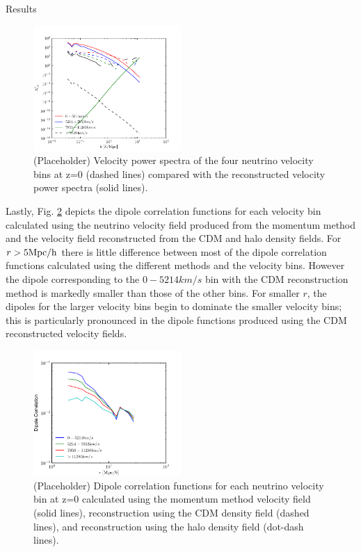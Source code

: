 \begin{section}{Results}
\begin{figure}[htbp]
  \begin{center}
    \includegraphics[width=0.5\textwidth]{./figures/VelPowerSpectra/velpower.pdf}
    \caption{(Placeholder) Velocity power spectra of the four neutrino velocity
	      bins at z=0 (dashed lines) compared with the reconstructed velocity
	      power spectra (solid lines).}
    \label{fig:velpowerfig}
  \end{center}
\end{figure}

\par Lastly, Fig. \ref{fig:dipolefig} depicts the dipole correlation 
functions for each velocity bin calculated using the neutrino
velocity field produced from the momentum method and the velocity 
field reconstructed from the CDM and halo density fields. For $r>5\mbox{Mpc}/\mbox{h}$ 
there is little difference between most of the dipole correlation functions
calculated using the different methods and the velocity bins. However the
dipole corresponding to the $0-5214km/s$ bin with the CDM 
reconstruction method is markedly smaller than those of the other bins. 
For smaller $r$, the dipoles for the larger velocity bins begin to
dominate the smaller velocity bins; this is particularly pronounced in 
the dipole functions produced using the CDM reconstructed velocity fields.

\begin{figure}[htbp]
  \begin{center}
    \includegraphics[width=0.5\textwidth]{./figures/Dipole/dipolefig.pdf}
    \caption{(Placeholder) Dipole correlation functions for each neutrino
	      velocity bin at z=0 calculated using the momentum method
	      velocity field (solid lines), reconstruction using the CDM 
	      density field (dashed lines), and reconstruction using the halo
	      density field (dot-dash lines).}
    \label{fig:dipolefig}
  \end{center}
\end{figure}

\end{section}
